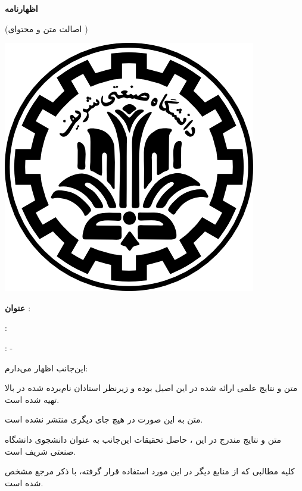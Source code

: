 
{\parindent0pt

\begin{center}
{\large\bf اظهارنامه}

{\small(اصالت متن و محتوای \ThesisType{} \ThesisDegree)}
\end{center}
\vspace{-6em}
\includegraphics[scale=0.15]{front/template/images/logo.png}
\vspace{1em}

\textbf{عنوان ‌\ThesisType}: \ThesisTitle

\vspace{.1em}
\begin{multicols}{2}
	{: \ThesisSupervisor}
	
	{: -}
\end{multicols}

\vspace{0.2em}
این‌جانب {\ThesisAuthor} اظهار می‌دارم:
\begin{شمارش}
\item متن و نتایج علمی ارائه شده در این \ThesisType{} اصیل بوده و زیرنظر استادان نام‌برده ‌شده در بالا تهیه شده است.
\item متن \ThesisType{} به این صورت در هیچ جای دیگری منتشر نشده است.
\item متن و نتایج مندرج در این \ThesisType، حاصل تحقیقات این‌جانب به عنوان دانشجوی \ThesisDegree{} دانشگاه صنعتی شریف است.
\item کلیه مطالبی که از منابع دیگر در این \ThesisType{} مورد استفاده قرار گرفته، با ذکر مرجع مشخص شده است.
\end{شمارش}

}
